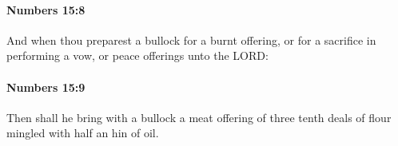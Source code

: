 		\paragraph{Numbers 15:8} %
			\label{NUMBERS-15-8}

			And when thou preparest a bullock for a burnt offering, or for a sacrifice in performing a vow, or peace offerings unto the LORD:


		\paragraph{Numbers 15:9} %
			\label{NUMBERS-15-9}

			Then shall he bring with a bullock a meat offering of three tenth deals of flour mingled with half an hin of oil.


